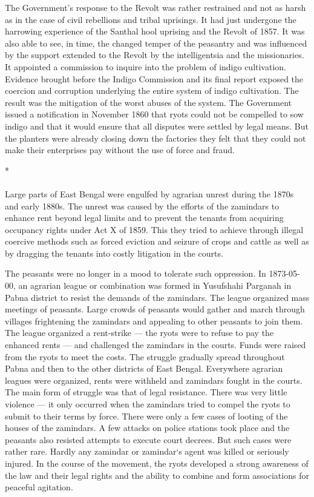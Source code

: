 The Government's response to the Revolt was rather restrained and not as harsh as in the case of civil rebellions and tribal uprisings. It had just undergone the harrowing experience of the Santhal hool uprising and the Revolt of 1857. It was also able to see, in time, the changed temper of the peasantry and was influenced by the support extended to the Revolt by the intelligentsia and the missionaries. It appointed a commission to inquire into the problem of indigo cultivation. Evidence brought before the Indigo Commission and its final report exposed the coercion and corruption underlying the entire system of indigo cultivation. The result was the mitigation of the worst abuses of the system. The Government issued a notification in November 1860 that ryots could not be compelled to sow indigo and that it would ensure that all disputes were settled by legal means. But the planters were already closing down the factories they felt that they could not make their enterprises pay without the use of force and fraud.

\begin{center}*\end{center}

\paragraph*{}
Large parts of East Bengal were engulfed by agrarian unrest during the 1870s and early 1880s. The unrest was caused by the efforts of the zamindars to enhance rent beyond legal limits and to prevent the tenants from acquiring occupancy rights under Act X of 1859. This they tried to achieve through illegal coercive methods such as forced eviction and seizure of crops and cattle as well as by dragging the tenants into costly litigation in the courts.

The peasants were no longer in a mood to tolerate such oppression. In 1873-05-00, an agrarian league or combination was formed in Yusufshahi Parganah in Pabna district to resist the demands of the zamindars. The league organized mass meetings of peasants. Large crowds of peasants would gather and march through villages frightening the zamindars and appealing to other peasants to join them. The league organized a rent-strike — the ryots were to refuse to pay the enhanced rents — and challenged the zamindars in the courts. Funds were raised from the ryots to meet the costs. The struggle gradually spread throughout Pabna and then to the other districts of East Bengal. Everywhere agrarian leagues were organized, rents were withheld and zamindars fought in the courts. The main form of struggle was that of legal resistance. There was very little violence — it only occurred when the zamindars tried to compel the ryots to submit to their terms by force. There were only a few cases of looting of the houses of the zamindars. A few attacks on police stations took place and the peasants also resisted attempts to execute court decrees. But such cases were rather rare. Hardly any zamindar or zamindar`s agent was killed or seriously injured. In the course of the movement, the ryots developed a strong awareness of the law and their legal rights and the ability to combine and form associations for peaceful agitation.

